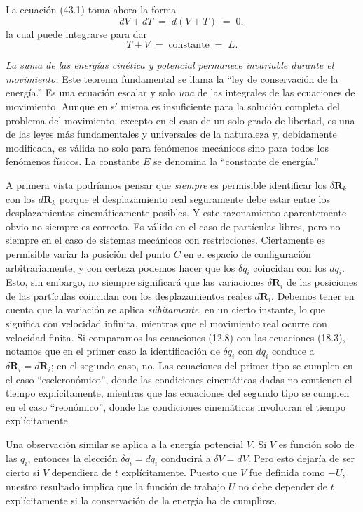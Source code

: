 \documentclass[12pt,a4paper]{book}
\begin{document}
La ecuación (43.1) toma ahora la forma
\begin{equation}
dV + dT \;=\; d(V + T) \;=\; 0, \tag{43.4}
\end{equation}
la cual puede integrarse para dar
\[
T + V \;=\; \text{constante} \;=\; E.
\]

\textit{La suma de las energías cinética y potencial permanece invariable durante el movimiento.} Este teorema fundamental se llama la ``ley de conservación de la energía.'' Es una ecuación escalar y solo \textit{una} de las integrales de las ecuaciones de movimiento. Aunque en sí misma es insuficiente para la solución completa del problema del movimiento, excepto en el caso de un solo grado de libertad, es una de las leyes más fundamentales y universales de la naturaleza y, debidamente modificada, es válida no solo para fenómenos mecánicos sino para todos los fenómenos físicos. La constante $E$ se denomina la ``constante de energía.''

A primera vista podríamos pensar que \textit{siempre} es permisible identificar los $\delta\mathbf{R}_k$ con los $d\mathbf{R}_k$ porque el desplazamiento real seguramente debe estar entre los desplazamientos cinemáticamente posibles. Y este razonamiento aparentemente obvio no siempre es correcto. Es válido en el caso de partículas libres, pero no siempre en el caso de sistemas mecánicos con restricciones. Ciertamente es permisible variar la posición del punto $C$ en el espacio de configuración arbitrariamente, y con certeza podemos hacer que los $\delta q_i$ coincidan con los $dq_i$. Esto, sin embargo, no siempre significará que las variaciones $\delta\mathbf{R}_i$ de las posiciones de las partículas coincidan con los desplazamientos reales $d\mathbf{R}_i$. Debemos tener en cuenta que la variación se aplica \textit{súbitamente}, en un cierto instante, lo que significa con velocidad infinita, mientras que el movimiento real ocurre con velocidad finita. Si comparamos las ecuaciones (12.8) con las ecuaciones (18.3), notamos que en el primer caso la identificación de $\delta q_i$ con $dq_i$ conduce a $\delta\mathbf{R}_i = d\mathbf{R}_i$; en el segundo caso, no. Las ecuaciones del primer tipo se cumplen en el caso ``escleronómico'', donde las condiciones cinemáticas dadas no contienen el tiempo explícitamente, mientras que las ecuaciones del segundo tipo se cumplen en el caso ``reonómico'', donde las condiciones cinemáticas involucran el tiempo explícitamente.

Una observación similar se aplica a la energía potencial $V$. Si $V$ es función solo de las $q_i$, entonces la elección $\delta q_i = dq_i$ conducirá a $\delta V = dV$. Pero esto dejaría de ser cierto si $V$ dependiera de $t$ explícitamente. Puesto que $V$ fue definida como $-U$, nuestro resultado implica que la función de trabajo $U$ no debe depender de $t$ explícitamente si la conservación de la energía ha de cumplirse.
\end{document}
